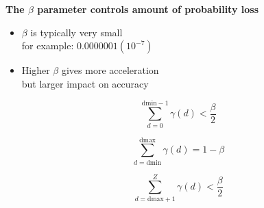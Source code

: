 \documentclass[landscape]{slides}
\begin{document}
\begin{slide}
\begin{center}
\textbf{The $\beta$ parameter controls amount of probability loss}
\end{center}

\begin{minipage}{6in}


\vspace{1in}
\begin{itemize} 
\item $\beta$ is typically very small \\
  for example: $0.0000001 (10^{-7})$
\item Higher $\beta$ gives more acceleration \\ but larger impact on
  accuracy
\end{itemize}

\vspace{1.5in}
\end{minipage}
\begin{minipage}{4in}

\small

\[
   \sum_{d = 0}^{\mbox{dmin} - 1} \gamma(d) < \frac{\beta}{2}
\]

\[
   \sum_{d = \mbox{dmin}}^{\mbox{dmax}} \gamma(d) = 1 - \beta
\]

\[
   \sum_{d = \mbox{dmax} + 1}^{Z} \gamma(d) < \frac{\beta}{2}
\]


\vspace{3in}
\end{minipage}


\end{slide}
\end{document}
